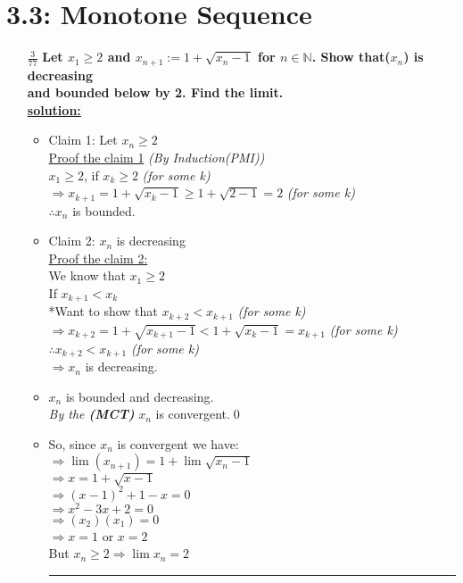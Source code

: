 \documentclass[fleqn,a4paper,12pt,towside]{amsbook}
\begin{document}
\section*{{\large 3.3: Monotone Sequence}}
\vspace{1cm}
\begin{enumerate}
\item[\large{$\boxed{\frac{3}{77}}$}]  \textbf{Let $x_1\geq2$ and $x_{n+1}:=1+\sqrt{x_n-1}$ for $n \in\mathbb{N}$. Show that($x_n$) is decreasing\\ and bounded below by 2. Find the limit.}\\
\textbf{\underline{solution:}}
\begin{itemize}
\item Claim 1: Let $x_n \geq 2$\\
\underline{Proof the claim 1} \textit{(By Induction(PMI))}\\
$x_1\geq2$, if $x_k\geq2$\hspace{.4cm} \textit{(for some k)} \\
$\Rightarrow x_{k+1}=1+\sqrt{x_k-1}\geq 1+\sqrt{2-1}=2$\hspace{.4cm} \textit{(for some k)}\\
$\therefore x_n$ is bounded.\\
\item Claim 2: $x_n$ is decreasing\\
\underline{Proof the claim 2:}\\
We know that $x_1\geq 2$\\
If $x_{k+1}<x_k$\\
*Want to show that $x_{k+2}<x_{k+1}$ \hspace{.4cm} \textit{(for some k)}\\
$\Rightarrow x_{k+2}=1+\sqrt{x_{k+1}-1}<1+\sqrt{x_k-1}=x_{k+1}$  \hspace{.4cm} \textit{(for some k)}\\
$\therefore x_{k+2}<x_{k+1}$ \hspace{.4cm} \textit{(for some k)}\\
$\Rightarrow x_n$ is decreasing.\\ 
\item $x_n$ is bounded and decreasing. \\
\textit{By the \textbf{(MCT)}} $x_n$ is convergent.\qed\\
\item So, since $x_n$ is convergent we have: \\
$\Rightarrow \lim (x_{n+1})=1+\lim \sqrt{x_n-1}$\\
$\Rightarrow x=1+\sqrt{x-1}$\\
$\Rightarrow (x-1)^2+1-x=0$\\
$\Rightarrow x^2-3x+2=0$\\
$\Rightarrow (x_2)(x_1)=0$\\
$\Rightarrow x=1$ or $x=2$\\
But $x_n\geq 2\Rightarrow\boxed{\lim x_n=2}$\\
\noindent\rule{17cm}{1pt}


\end{itemize}
\end{enumerate}
\end{document}
